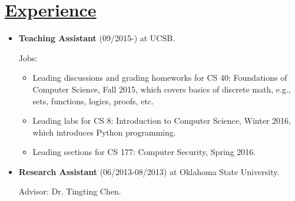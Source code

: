 \documentclass{article}
\newlength{\nL}
\newcommand{\underLineText}[1]{\settowidth{\nL}{#1}\setlength{\nL}{0.95\textwidth-\nL}\underline{{\sc #1}\hspace{\nL}}}
\begin{document}
\section*{\underLineText{Experience}}
\begin{itemize}
\item {\bf Teaching Assistant} (09/2015-) at UCSB.

Jobs: 
	\begin{itemize}
	\item Leading discussions and grading homeworks for CS 40: Foundations of Computer Science, Fall 2015, which covers basics of discrete math, e.g., sets, functions, logics, proofs, etc.
	\item Leading labs for CS 8: Introduction to Computer Science, Winter 2016, which introduces Python programming.
	\item Leading sections for CS 177: Computer Security, Spring 2016.
	\end{itemize}
\item {\bf Research Assistant} (06/2013-08/2013) at Oklahoma State University.

Advisor: Dr. Tingting Chen.


\end{itemize}
\end{document}
